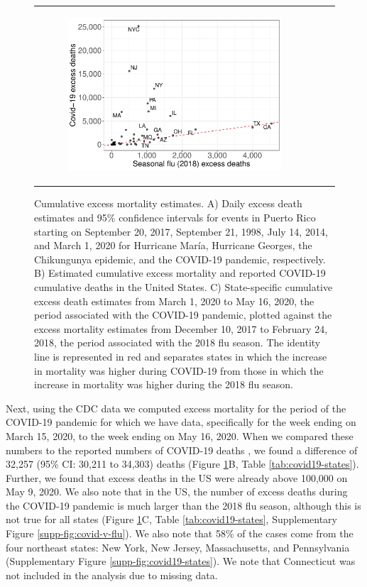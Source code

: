 \documentclass[11pt]{article}
\begin{document}
\begin{figure}[ht]
\begin{tabular}{lll}
\begin{subfigure}[t]{0.3\linewidth}
		\includegraphics[width=1\linewidth]{figs/figure-2c.pdf}
	\end{subfigure}\\
	\end{tabular}
    \caption{Cumulative excess mortality estimates. A) Daily excess death estimates and 95\% confidence intervals for events in Puerto Rico starting on September 20, 2017, September 21, 1998, July 14, 2014, and March 1, 2020 for Hurricane Mar\'ia, Hurricane Georges, the Chikungunya epidemic, and the COVID-19 pandemic, respectively.  B) Estimated cumulative excess mortality and reported COVID-19 cumulative deaths in the United States. C) State-specific cumulative excess death estimates from March 1, 2020 to May 16, 2020, the period associated with the COVID-19 pandemic, plotted against the excess mortality estimates from December 10, 2017 to February 24, 2018, the period associated with the 2018 flu season. The identity line is represented in red and separates states in which the increase in mortality was higher during COVID-19 from those in which the increase in mortality was higher during the 2018 flu season.}
    \label{fig:excess-deaths}
\end{figure}

Next, using the CDC data we computed excess mortality for the period of the COVID-19 pandemic for which we have data, specifically for the week ending on March 15, 2020, to the week ending on May 16, 2020. When we compared these numbers to the reported numbers of COVID-19 deaths \cite{smith2020coronavirus}, we found a difference of 32,257 (95\% CI: 30,211 to 34,303) deaths (Figure \ref{fig:excess-deaths}B, Table \ref{tab:covid19-states}). Further, we found that excess deaths in the US were already above 100,000 on May 9, 2020. We also note that in the US, the number of excess deaths during the COVID-19 pandemic is much larger than the 2018 flu season, although this is not true for all states (Figure \ref{fig:excess-deaths}C, Table \ref{tab:covid19-states}, Supplementary Figure \ref{supp-fig:covid-v-flu}). We also note that 58\% of the cases come from the four northeast states: New York, New Jersey, Massachusetts, and Pennsylvania (Supplementary Figure \ref{supp-fig:covid19-states}). We note that Connecticut was not included in the analysis due to missing data.
\end{document}
